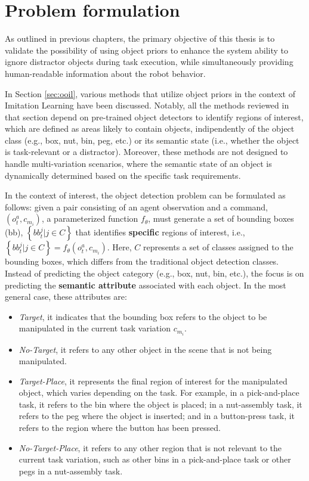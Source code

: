 \section{Problem formulation}
\label{sec:cod_problem}
As outlined in previous chapters, the primary objective of this thesis is to validate the possibility of using object priors to enhance the system ability to ignore distractor objects during task execution, while simultaneously providing human-readable information about the robot behavior.

In Section \ref{sec:ooil}, various methods that utilize object priors in the context of Imitation Learning have been discussed. Notably, all the methods reviewed in that section depend on pre-trained object detectors to identify regions of interest, which are defined as areas likely to contain objects, indipendently of the object class (e.g., box, nut, bin, peg, etc.) or its semantic state (i.e., whether the object is task-relevant or a distractor). Moreover, these methods are not designed to handle multi-variation scenarios, where the semantic state of an object is dynamically determined based on the specific task requirements.

In the context of interest, the object detection problem can be formulated as follows: given a pair consisting of an agent observation and a command, $\left( o_{t}^{a}, c_{m_{i}} \right)$,  a parameterized function $f_{\theta}$, must generate a set of bounding boxes (bb), $\left\{ bb^{j}_{t} | j \in C \right\}$ that identifies \textbf{specific} regions of interest, i.e., $\left\{ bb^{j}_{t} | j \in C \right\} = f_{\theta}(o_{t}^{a}, c_{m_{i}})$. Here, $C$ represents a set of classes assigned to the bounding boxes, which differs from the traditional object detection classes. Instead of predicting the object category (e.g., box, nut, bin, etc.), the focus is on predicting the \textbf{semantic attribute} associated with each object. In the most general case, these attributes are:

\begin{itemize} 
    \item \textit{Target}, it indicates that the bounding box refers to the object to be manipulated in the current task variation $c_{m_{i}}$. 
    \item \textit{No-Target}, it refers to any other object in the scene that is not being manipulated. 
    \item \textit{Target-Place}, it represents the final region of interest for the manipulated object, which varies depending on the task. For example, in a pick-and-place task, it refers to the bin where the object is placed; in a nut-assembly task, it refers to the peg where the object is inserted; and in a button-press task, it refers to the region where the button has been pressed. 
    \item \textit{No-Target-Place}, it refers to any other region that is not relevant to the current task variation, such as other bins in a pick-and-place task or other pegs in a nut-assembly task. 
\end{itemize}

